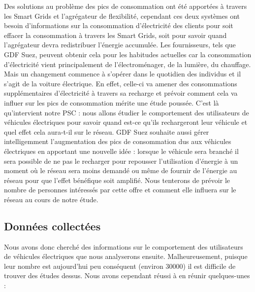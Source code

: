 \documentclass[10pt]{article}
\begin{document}
			Des solutions au problème des pics de consommation ont été apportées à travers les Smart Grids et l’agrégateur de flexibilité, cependant ces deux systèmes ont besoin d’informations sur la consommation d’électricité des clients pour soit effacer la consommation à travers les Smart Grids, soit pour savoir quand l’agrégateur devra redistribuer l’énergie accumulée. Les fournisseurs, tels que GDF Suez, peuvent obtenir cela pour les habitudes actuelles car la consommation d’électricité vient principalement de l’électroménager, de la lumière, du chauffage. Mais un changement commence à s’opérer dans le quotidien des individus et il s’agit de la voiture électrique. En effet, celle-ci va amener des consommations supplémentaires d’électricité à travers sa recharge et prévoir comment cela va influer sur les pics de consommation mérite une étude poussée. C’est là qu’intervient notre PSC : nous allons étudier le comportement des utilisateurs de véhicules électriques pour savoir quand est-ce qu’ils rechargeront leur véhicule et quel effet cela aura-t-il sur le réseau. GDF Suez souhaite aussi gérer intelligemment l’augmentation des pics de consommation dus aux véhicules électriques en apportant une nouvelle idée : lorsque le véhicule sera branché il sera possible de ne pas le recharger pour repousser l’utilisation d’énergie à un moment où le réseau sera moins demandé ou même de fournir de l’énergie au réseau pour que l’effet bénéfique soit amplifié. Nous tenterons de prévoir le nombre de personnes intéressés par cette offre et comment elle influera sur le réseau au cours de notre étude.
			
			
	
	\subsection{Données collectées}
	
		Nous avons donc cherché des informations sur le comportement des utilisateurs de véhicules électriques que nous analyserons ensuite. Malheureusement, puisque leur nombre est aujourd’hui peu conséquent (environ 30000) il est difficile de trouver des études dessus. Nous avons cependant réussi à en réunir quelques-unes :
		
\end{document}
